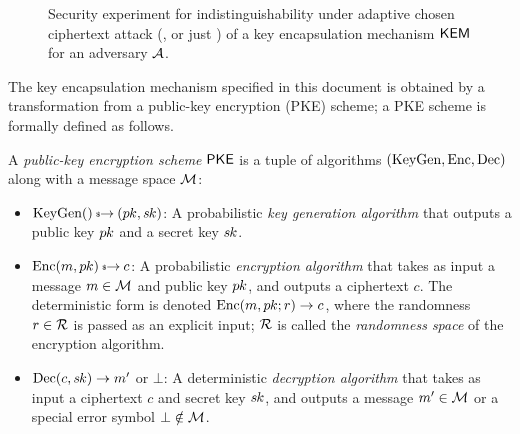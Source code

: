 \documentclass{iacrcc}
\begin{document}
\begin{figure}[h]
\centering
{}
\caption{Security experiment for indistinguishability under adaptive
  chosen ciphertext attack (\INDCCATwo, or just \INDCCA) of a key
  encapsulation mechanism $\textsf{\upshape\mdseries KEM}$ for an adversary $\mathcal{A}$.}
\label{fig:kem-indcca}
\end{figure}

The key encapsulation mechanism specified in this document is obtained by a transformation from a public-key encryption (PKE) scheme; a PKE scheme is formally defined as follows.

\begin{definition}
  A \emph{public-key encryption scheme} $\textsf{\upshape\mdseries PKE}$ is a tuple of
  algorithms $(\textrm{\upshape\mdseries KeyGen},\textrm{\upshape\mdseries Enc},\textrm{\upshape\mdseries Dec})$ along with a message space
  $\mathcal{M}$:
\begin{itemize}
\item $\KeyGen() \tor (\pk, \sk)$: A probabilistic \emph{key generation algorithm} that outputs a public key $p\mkern-0.5muk$ and a secret key $s\mkern-1muk$.
\item $\Enc(m, \pk) \tor c$: A probabilistic \emph{encryption
    algorithm} that takes as input a message $m \in \mathcal{M}$ and public
  key $p\mkern-0.5muk$, and outputs a ciphertext $c$.  The deterministic form is
  denoted $\textrm{\upshape\mdseries Enc}(m, p\mkern-0.5muk; r) \to c$, where the randomness
  $r \in \mathcal{R}$ is passed as an explicit input; $\mathcal{R}$ is called
  the \emph{randomness space} of the encryption algorithm.
\item $\textrm{\upshape\mdseries Dec}(c, s\mkern-1muk) \to m'$ or $\bot$: A deterministic
  \emph{decryption algorithm} that takes as input a ciphertext $c$ and
  secret key $s\mkern-1muk$, and outputs a message $m' \in \mathcal{M}$ or a
  special error symbol $\bot \notin \mathcal{M}$.
\end{itemize}
\end{definition}
\end{document}

